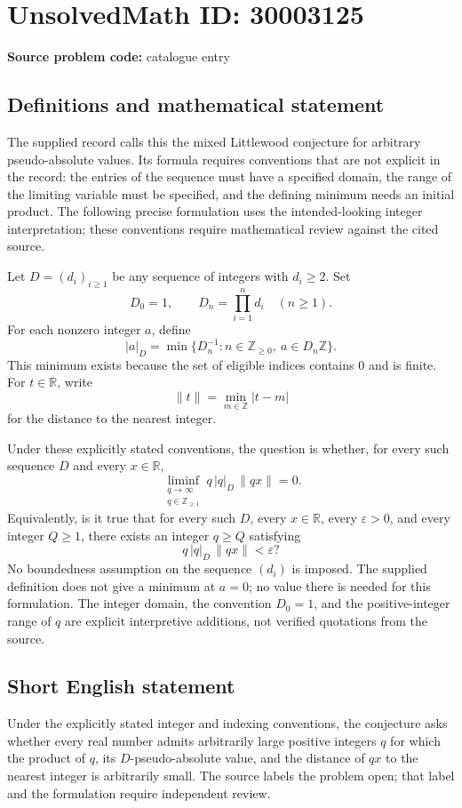 \documentclass[11pt]{article}
\newcommand{\Z}{\mathbb{Z}}
\newcommand{\R}{\mathbb{R}}
\begin{document}
\section*{UnsolvedMath ID: 30003125}
\textbf{Source problem code:} catalogue entry
\subsection{Definitions and mathematical statement}
The supplied record calls this the mixed Littlewood conjecture for arbitrary pseudo-absolute values. Its formula requires conventions that are not explicit in the record: the entries of the sequence must have a specified domain, the range of the limiting variable must be specified, and the defining minimum needs an initial product. The following precise formulation uses the intended-looking integer interpretation; these conventions require mathematical review against the cited source.

Let \(D=(d_i)_{i\geq 1}\) be any sequence of integers with \(d_i\geq 2\). Set
\[
D_0=1,\qquad D_n=\prod_{i=1}^{n}d_i\quad(n\geq 1).
\]
For each nonzero integer \(a\), define
\[
|a|_D=\min\{D_n^{-1}:n\in\Z_{\geq 0},\ a\in D_n\Z\}.
\]
This minimum exists because the set of eligible indices contains \(0\) and is finite. For \(t\in\R\), write
\[
\|t\|=\min_{m\in\Z}|t-m|
\]
for the distance to the nearest integer.

Under these explicitly stated conventions, the question is whether, for every such sequence \(D\) and every \(x\in\R\),
\[
\liminf_{\substack{q\to\infty\\q\in\Z_{\geq 1}}}q\,|q|_D\,\|qx\|=0.
\]
Equivalently, is it true that for every such \(D\), every \(x\in\R\), every \(\varepsilon>0\), and every integer \(Q\geq 1\), there exists an integer \(q\geq Q\) satisfying
\[
q\,|q|_D\,\|qx\|<\varepsilon?
\]
No boundedness assumption on the sequence \((d_i)\) is imposed. The supplied definition does not give a minimum at \(a=0\); no value there is needed for this formulation. The integer domain, the convention \(D_0=1\), and the positive-integer range of \(q\) are explicit interpretive additions, not verified quotations from the source.
\subsection{Short English statement}
Under the explicitly stated integer and indexing conventions, the conjecture asks whether every real number admits arbitrarily large positive integers \(q\) for which the product of \(q\), its \(D\)-pseudo-absolute value, and the distance of \(qx\) to the nearest integer is arbitrarily small. The source labels the problem open; that label and the formulation require independent review.
\end{document}
